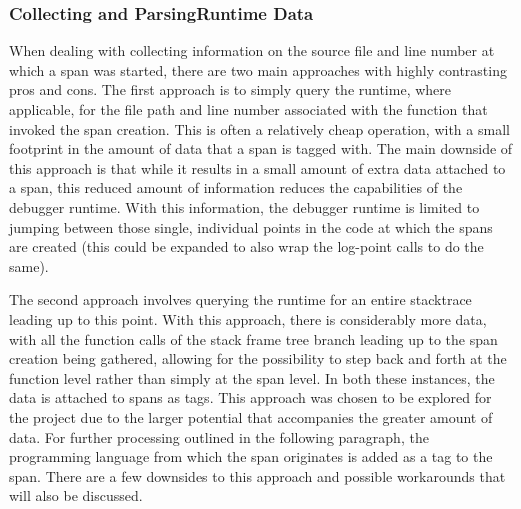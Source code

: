 \documentclass[12pt,pdftex,titlepage]{report}
\begin{document}
                \subsubsection{Collecting and ParsingRuntime Data}
                    When dealing with collecting information on the source file and line number at which a span was started, there are two main approaches with highly contrasting pros and cons.
                    The first approach is to simply query the runtime, where applicable, for the file path and line number associated with the function that invoked the span creation. This is often
                    a relatively cheap operation, with a small footprint in the amount of data that a span is tagged with. The main downside of this approach is that while it results in a small 
                    amount of extra data attached to a span, this reduced amount of information reduces the capabilities of the debugger runtime. With this information, the debugger runtime is
                    limited to jumping between those single, individual points in the code at which the spans are created (this could be expanded to also wrap the log-point calls to do the same).
                    
                    The second approach involves querying the runtime for an entire stacktrace leading up to this point. With this approach, there is considerably more data, with all the function
                    calls of the stack frame tree branch leading up to the span creation being gathered, allowing for the possibility to step back and forth at the function level rather than simply
                    at the span level. In both these instances, the data is attached to spans as tags. This approach was chosen to be explored for the project due to the larger potential that accompanies
                    the greater amount of data. For further processing outlined in the following paragraph, the programming language from which the span originates is added as a tag to the span.
                    There are a few downsides to this approach and possible workarounds that will also be discussed.
                    
\end{document}
